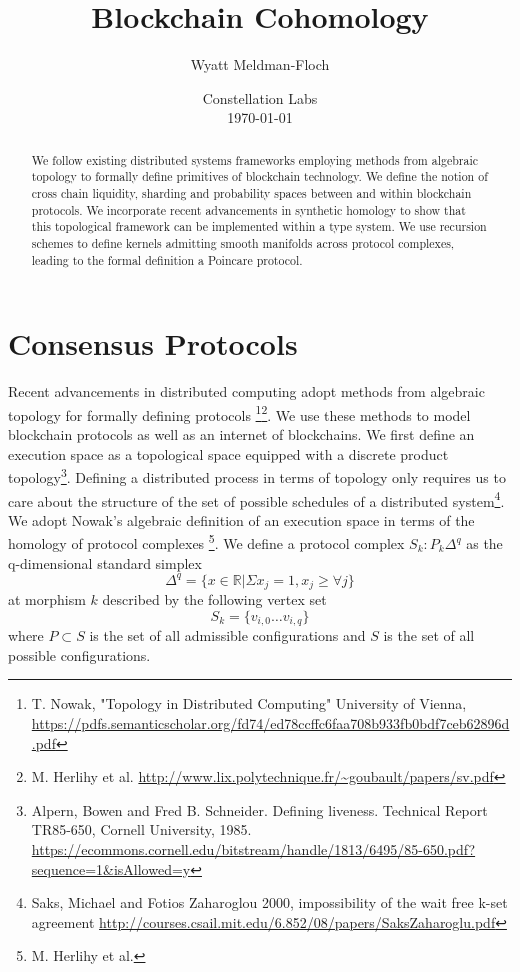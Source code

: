 \documentclass{article}
\title{Blockchain Cohomology}
\author{Wyatt Meldman-Floch}
\date{%
    Constellation Labs\\%
    \today}
\begin{document}
\maketitle

\begin{abstract}
We follow existing distributed systems frameworks employing methods from algebraic topology to formally define primitives of blockchain technology. We define the notion of cross chain liquidity, sharding and probability spaces between and within blockchain protocols. We incorporate recent advancements in synthetic homology to show that this topological framework can be implemented within a type system. We use recursion schemes to define kernels admitting smooth manifolds across protocol complexes, leading to the formal definition a Poincare protocol.

\end{abstract}

\section{Consensus Protocols}
Recent advancements in distributed computing adopt methods from algebraic topology for formally defining protocols \footnote{T. Nowak, "Topology in Distributed Computing" University of Vienna, \url{https://pdfs.semanticscholar.org/fd74/ed78ccffc6faa708b933fb0bdf7ceb62896d.pdf}}\footnote{M. Herlihy et al. \url{http://www.lix.polytechnique.fr/~goubault/papers/sv.pdf}}. We use these methods to model blockchain protocols as well as an internet of blockchains. We first define an execution space as a topological space equipped with a discrete product topology\footnote{Alpern, Bowen and Fred B. Schneider. Defining liveness. Technical Report TR85-650,
Cornell University, 1985. \url{https://ecommons.cornell.edu/bitstream/handle/1813/6495/85-650.pdf?sequence=1&isAllowed=y}}. Defining a distributed process in terms of topology only requires us to care about the structure of the set of possible schedules of a distributed system\footnote{Saks, Michael and Fotios Zaharoglou 2000, impossibility of the wait free k-set agreement \url{http://courses.csail.mit.edu/6.852/08/papers/SaksZaharoglu.pdf}}. We adopt Nowak's algebraic definition of an execution space in terms of the homology of protocol complexes \footnote{M. Herlihy et al.}. We define a protocol complex $S_k: P_k{\Delta^q}$ as the q-dimensional standard simplex
\begin{equation} \label{eq1}
\Delta^q = \{x \in \mathbb{R} | \Sigma x_j = 1, x_j \geq \forall j \}
\end{equation} \label{eq1}
at morphism $k$ described by the following vertex set
\begin{equation} \label{eq1}
S_k = \{v_{i,0} \dots v_{i,q}\}
\end{equation} \label{eq1}
where $P \subset S$ is the set of all admissible configurations and $S$ is the set of all possible configurations.
 
\end{document}
